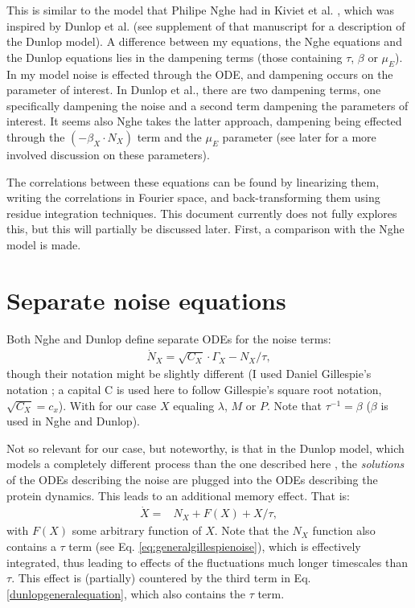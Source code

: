 This is similar to the model that Philipe Nghe had in Kiviet et al. \cite{Kiviet2014}, which was inspired by Dunlop et al. \cite{Dunlop2008} (see supplement of that manuscript for a description of the Dunlop model).
%
A difference between my equations, the Nghe equations and the Dunlop equations lies in the dampening terms (those containing $\tau$, $\beta$ or $\mu_E$). In my model noise is effected through the ODE, and dampening occurs on the parameter of interest. In Dunlop et al., there are two dampening terms, one specifically dampening the noise and a second term dampening the parameters of interest. It seems also Nghe takes the latter approach, dampening being effected through the $(-\beta_X \cdot N_X)$ term and the $\mu_E$ parameter (see later for a more involved discussion on these parameters).

The correlations between these equations can be found by linearizing them, writing the correlations in Fourier space, and back-transforming them using residue integration techniques. 
This document currently does not fully explores this, but this will partially be discussed later.
First, a comparison with the Nghe model is made.

\section{Separate noise equations}

Both Nghe and Dunlop define separate ODEs for the noise terms:
%
\begin{align}
\label{eq:generalgillespienoise}
\dot{N}_X = \sqrt{C_X} \cdot \Gamma_X - N_X/\tau
,
\end{align}
%
though their notation might be slightly different (I used Daniel Gillespie's notation \cite{Gillespie1996}; a capital C is used here to follow Gillespie's square root notation, $\sqrt{C_X}=c_x$).
With for our case $X$ equaling $\lambda$, $M$ or $P$. Note that $\tau^{-1}=\beta$ ($\beta$ is used in Nghe and Dunlop).

Not so relevant for our case, but noteworthy, is that in the Dunlop model, which models a completely different process than the one described here \cite{Dunlop2008}, the \textit{solutions} of the ODEs describing the noise are plugged into the ODEs describing the protein dynamics. This leads to an additional memory effect.
%
That is:
%
\begin{align}
\label{dunlopgeneralequation}
\dot{X} = & N_X  + F(X) + X/\tau
,
\end{align}
%
with $F(X)$ some arbitrary function of $X$. 
Note that the $N_X$ function also contains a $\tau$ term (see Eq. \ref{eq:generalgillespienoise}), which is effectively integrated, thus leading to effects of the fluctuations much longer timescales than $\tau$. 
This effect is (partially) countered by the third term in Eq. \ref{dunlopgeneralequation}, which also contains the $\tau$ term.

